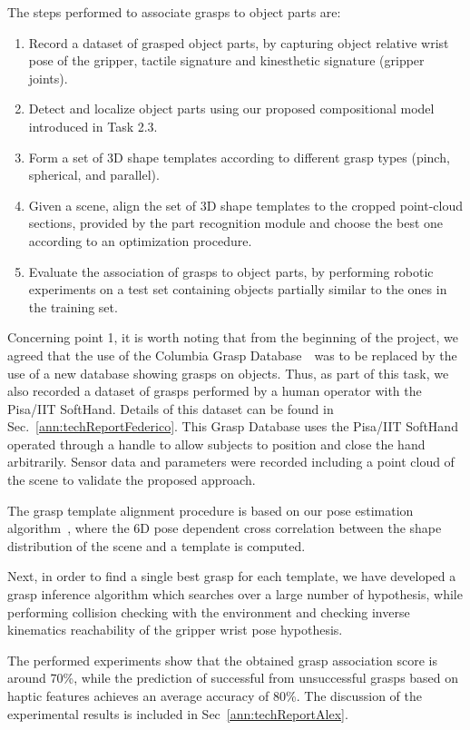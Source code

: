 \documentclass[a4paper,11pt,pdf]{pacmanreport}
\begin{document}
The steps performed to associate grasps to object parts are:
\begin{enumerate}
\item Record a dataset of grasped object parts, by capturing object relative wrist pose of the gripper, tactile signature and kinesthetic signature (gripper joints).
\item Detect and localize object parts using our proposed compositional model introduced in Task 2.3.
\item Form a set of 3D shape templates according to different grasp types (pinch, spherical, and parallel).
\item Given a scene, align the set of 3D shape templates to the cropped point-cloud sections, provided by the part recognition module and choose the best one according to an optimization procedure.
\item Evaluate the association of grasps to object parts, by performing robotic experiments on a test set containing objects partially similar to the ones in the training set.
\end{enumerate}

Concerning point 1, it is worth noting that from the beginning of the project, we agreed that the use of the Columbia Grasp Database~\ was to be replaced by the use of a new database showing grasps on objects. Thus, as part of this task, we also recorded a dataset of grasps performed by a human operator with the Pisa/IIT SoftHand. Details of this dataset can be found in Sec.~\ref{ann:techReportFederico}. This Grasp Database uses the Pisa/IIT SoftHand operated through a handle to allow subjects to position and close the hand arbitrarily. Sensor data and parameters were recorded including a point cloud of the scene to validate the proposed approach.

The grasp template alignment procedure is based on our pose estimation algorithm~\cite{detry2010ac}, where the 6D pose dependent cross correlation between the shape distribution of the scene and a template is computed.

Next, in order to find a single best grasp for each template, we have developed a grasp inference algorithm which searches over a large number of hypothesis, while performing collision checking with the environment and checking inverse kinematics reachability of the gripper wrist pose hypothesis.

The performed experiments show that the obtained grasp association score is around 70\%, 
while the prediction of successful from unsuccessful grasps based on haptic 
features achieves an average accuracy of 80\%. The discussion of the 
experimental results is included in Sec~\ref{ann:techReportAlex}.
\end{document}
